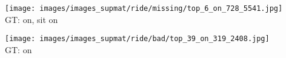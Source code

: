 \documentclass[10pt,twocolumn,letterpaper]{article}
\begin{document}
\begin{figure*}[t]
    \begin{minipage}[t]{0.18\textwidth}
    	\centering
       	\texttt{[image: images/images\_supmat/ride/missing/top\_6\_on\_728\_5541.jpg]}\\
       	\vspace{0.3ex}
       	GT: on, sit on
       	\vspace{0.2ex}
    \end{minipage}
    \hspace{0.005\textwidth}  
    \begin{minipage}[t]{0.18\textwidth}
    	\centering
       	\texttt{[image: images/images\_supmat/ride/bad/top\_39\_on\_319\_2408.jpg]}\\
       	\vspace{0.3ex}
       	GT: on
      	\vspace{0.2ex}
    \end{minipage} 
    

\end{figure*}
\end{document}
